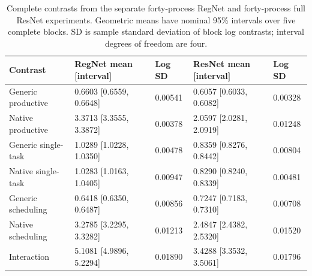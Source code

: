 \begin{table}[t]
\centering
\caption{Complete contrasts from the separate forty-process RegNet and forty-process full ResNet experiments. Geometric means have nominal 95\% intervals over five complete blocks. SD is sample standard deviation of block log contrasts; interval degrees of freedom are four.}
\label{tab:supp-scheduling-summary}
\begingroup\small\setlength{\tabcolsep}{3pt}
\begin{tabular}{lllll}
\toprule
Contrast & RegNet mean [interval] & Log SD & ResNet mean [interval] & Log SD \\
\midrule
Generic productive & 0.6603 [0.6559, 0.6648] & 0.00541 & 0.6057 [0.6033, 0.6082] & 0.00328 \\
Native productive & 3.3713 [3.3555, 3.3872] & 0.00378 & 2.0597 [2.0281, 2.0919] & 0.01248 \\
Generic single-task & 1.0289 [1.0228, 1.0350] & 0.00478 & 0.8359 [0.8276, 0.8442] & 0.00804 \\
Native single-task & 1.0283 [1.0163, 1.0405] & 0.00947 & 0.8290 [0.8240, 0.8339] & 0.00481 \\
Generic scheduling & 0.6418 [0.6350, 0.6487] & 0.00856 & 0.7247 [0.7183, 0.7310] & 0.00708 \\
Native scheduling & 3.2785 [3.2295, 3.3282] & 0.01213 & 2.4847 [2.4382, 2.5320] & 0.01520 \\
Interaction & 5.1081 [4.9896, 5.2294] & 0.01890 & 3.4288 [3.3532, 3.5061] & 0.01796 \\
\bottomrule
\end{tabular}
\endgroup
\end{table}
